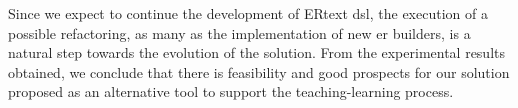 Since we expect to continue the development of ERtext \ac{dsl}, the execution of a possible refactoring, as many as the implementation of new \ac{er} builders, is a natural step towards the evolution of the solution.
From the experimental results obtained, we conclude that there is feasibility and good prospects for our solution proposed as an alternative tool to support the teaching-learning process.





